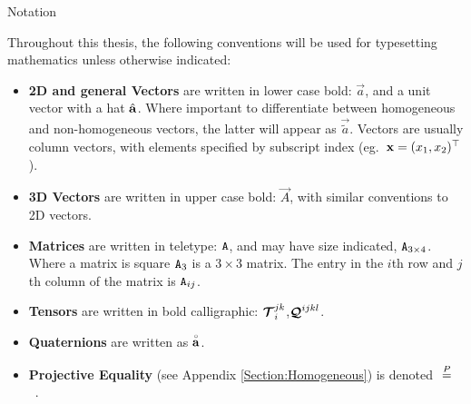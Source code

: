 \vspace*{20mm}
{
\Large\bf
\begin{center}
Notation
\end{center}
}

\label{sec:Notation}
Throughout this thesis, the following conventions will be used for
typesetting mathematics unless otherwise indicated:
\begin{itemize}
\item{\bf 2D and general Vectors} are written in lower case bold: $\vec{a}$,
and a unit vector with a hat $\uvec{a}$. Where important to
differentiate between homogeneous and non-homogeneous vectors, the
latter will appear as
$\vec{\tilde{a}}$. Vectors are usually column vectors,
with elements specified by subscript index (eg.\
$\vec{x}=(x_1,x_2)\tra$). 
\item{\bf 3D Vectors}  are written in upper case bold: $\vec{A}$, with similar conventions to 2D vectors.
\item{\bf Matrices} are written in teletype: $\mat{A}$, and may have size indicated,
$\mat{A}_{3\times4}$. Where a matrix is square $\mat{A}_3$ is a $3\times 3$ matrix.
The entry in the $i$th row and $j$th column of the matrix is $\matd{A}{ij}$.
\item{\bf Tensors} are written in bold calligraphic:
$\tensorud{T}{jk}i$,$\tensoru{Q}{ijkl}$.
\item{\bf Quaternions} are written as
$\quat{a}$.
\item{\bf Projective Equality} (see Appendix
\ref{Section:Homogeneous}) is denoted $\projeq$ ~.
\end{itemize}


